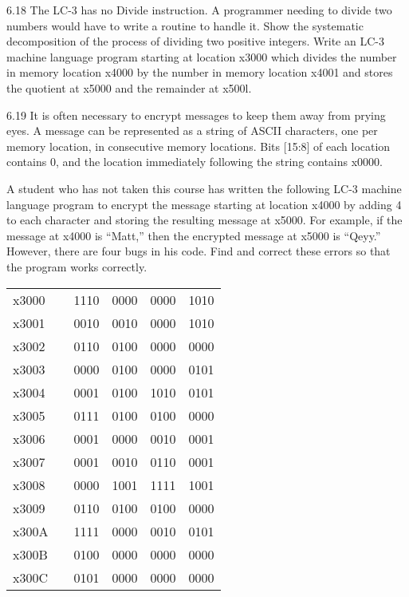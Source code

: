 \documentclass{patt}
\begin{document}
\begin{exercises}
\item[6.18] The LC-3 has no Divide instruction. A programmer needing
  to divide two numbers would have to write a routine to handle it.
  Show the systematic decomposition of the process of dividing two
  positive integers. Write an LC-3 machine language program starting
  at location x3000 which divides the number in memory location x4000
  by the number in memory location x4001 and stores the quotient at
  x5000 and the remainder at x500l.

\item[6.19] It is often necessary to encrypt messages to keep them
  away from prying eyes. A message can be represented as a string of
  ASCII characters, one per memory location, in consecutive memory
  locations. Bits [15:8] of each location contains 0, and the location
  immediately following the string contains x0000.

  A student who has not taken this course has written the following
  LC-3 machine language program to encrypt the message starting at
  location x4000 by adding 4 to each character and storing the
  resulting message at x5000. For example, if the message at x4000 is
  ``Matt,'' then the encrypted message at x5000 is ``Qeyy.'' However,
  there are four bugs in his code. Find and correct these errors so
  that the program works correctly.

\begin{inlinetable}
\ttfamily\color{seventyblack}
\begin{tabular}{@{}llllll@{}}
x3000 & & 1110 & 0000 & 0000 & 1010\\
x3001 &  &0010 & 0010 & 0000 & 1010 \\
x3002 &  &0110 & 0100 & 0000 & 0000 \\
x3003 &  &0000 & 0100 & 0000 & 0101 \\
x3004 &  &0001 & 0100 & 1010 & 0101 \\
x3005 & & 0111 & 0100 & 0100 & 0000 \\
x3006 & & 0001 & 0000 & 0010 & 0001 \\
x3007 & & 0001 & 0010 & 0110 & 0001 \\
x3008 & & 0000 & 1001 & 1111 & 1001 \\
x3009 & & 0110 & 0100 & 0100 & 0000 \\
x300A &  &1111 & 0000 & 0010 & 0101 \\
x300B &  &0100 & 0000 & 0000 & 0000 \\
x300C &  &0101 & 0000 & 0000 & 0000\\
\end{tabular}
\end{inlinetable}


\end{exercises}
\end{document}
